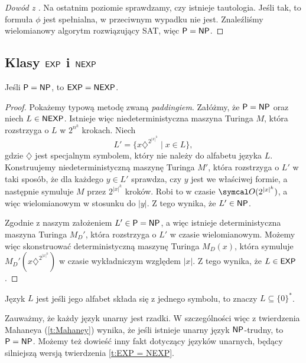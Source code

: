 \begin{proof}[Dowód z \cite{Grochow16}]
    Na ostatnim poziomie sprawdzamy, czy istnieje tautologia. Jeśli tak, to formuła $\phi$ jest spełnialna, w przeciwnym wypadku nie jest.
    Znaleźliśmy wielomianowy algorytm rozwiązujący SAT, więc $\textsf{P} = \textsf{NP}$.
\end{proof}

\subsection{Klasy $\textsf{EXP}$ i $\textsf{NEXP}$}

\begin{theorem}\label{t:EXP = NEXP}
    Jeśli $\textsf{P} = \textsf{NP}$, to $\textsf{EXP} = \textsf{NEXP}$.
\end{theorem}
\begin{proof}
    Pokażemy typową metodę zwaną \textit{paddingiem}. Załóżmy, że $\textsf{P} = \textsf{NP}$ oraz niech $L \in \textsf{NEXP}$. Istnieje więc niedeterministyczna maszyna Turinga $M$, która rozstrzyga o $L$ w $2^{n^k}$ krokach. Niech
    \[ L' = \{x\diamondsuit^{2^{|x|^k}} \mid x \in L\}, \]
    gdzie $\diamondsuit$ jest specjalnym symbolem, który nie należy do alfabetu języka $L$. Konstruujemy niedeterministyczną maszynę Turinga $M'$, która rozstrzyga o $L'$ w taki sposób, że dla każdego $y \in L'$ sprawdza, czy $y$ jest we właściwej formie, a następnie symuluje $M$ przez $2^{|x|^k}$ kroków. Robi to w czasie $\sO(2^{|x|^k})$, a więc wielomianowym w stosunku do $|y|$. Z tego wynika, że $L' \in \textsf{NP}$.

    Zgodnie z naszym założeniem $L' \in \textsf{P} = \textsf{NP}$, a więc istnieje deterministyczna maszyna Turinga $M_D'$, która rozstrzyga o $L'$ w czasie wielomianowym. Możemy więc skonstruować deterministyczną maszynę Turinga $M_D(x)$, która symuluje $M_D'(x\diamondsuit^{2^{|x|^k}})$ w czasie wykładniczym względem $|x|$. Z tego wynika, że $L \in \textsf{EXP}$.
\end{proof}

\begin{definition}
    Język $L$ jest  jeśli jego alfabet składa się z jednego symbolu, to znaczy $L \subseteq \{0\}^*$.
\end{definition}

Zauważmy, że każdy język unarny jest rzadki. W szczególności więc z twierdzenia Mahaneya (\ref{t:Mahaney}) wynika, że jeśli istnieje unarny język $\textsf{NP}$-trudny, to $\textsf{P} = \textsf{NP}$. Możemy też dowieść inny fakt dotyczący języków unarnych, będący silniejszą wersją twierdzenia \ref{t:EXP = NEXP}.

